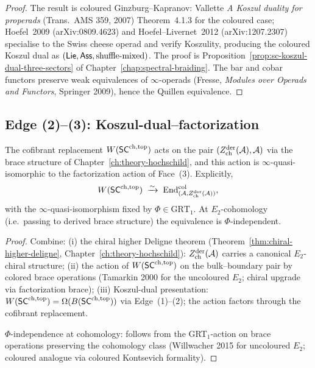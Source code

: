 \begin{proof}
The result is coloured Ginzburg--Kapranov: Vallette
\textit{A Koszul duality for properads} (Trans.\ AMS 359, 2007)
Theorem~4.1.3 for the coloured case; Hoefel~2009 (arXiv:0809.4623)
and Hoefel--Livernet~2012 (arXiv:1207.2307) specialise to the Swiss
cheese operad and verify Koszulity, producing the coloured Koszul
dual as $(\mathsf{Lie},\mathsf{Ass},\text{shuffle-mixed})$. The proof is
Proposition~\ref{prop:sc-koszul-dual-three-sectors} of
Chapter~\ref{chap:spectral-braiding}. The bar and
cobar functors preserve weak equivalences of $\infty$-operads
(Fresse, \textit{Modules over Operads and Functors}, Springer 2009),
hence the Quillen equivalence.
\end{proof}

\subsection{Edge (2)--(3): Koszul-dual--factorization}\label{subsec:edge-23}

\begin{theorem}\label{thm:edge-23}%
The cofibrant replacement $W(\mathsf{SC}^{\mathrm{ch},\mathrm{top}})$ acts on the pair
$(Z^{\mathrm{der}}_{\mathrm{ch}}(\mathcal{A}),\mathcal{A})$ via the brace structure of
Chapter~\ref{ch:theory-hochschild}, and this action is
$\infty$-quasi-isomorphic to the factorization action of
Face~(3). Explicitly,
\begin{equation}
 W(\mathsf{SC}^{\mathrm{ch},\mathrm{top}})
 \;\xrightarrow{\sim}\;
 \mathrm{End}^{\mathrm{col}}_{(\mathcal{A},Z^{\mathrm{der}}_{\mathrm{ch}}(\mathcal{A}))},
\end{equation}
with the $\infty$-quasi-isomorphism fixed by $\Phi\in\mathrm{GRT}_1$.
At $E_2$-cohomology (i.e.\ passing to derived brace structure) the
equivalence is $\Phi$-independent.
\end{theorem}

\begin{proof}
Combine:
(i) the chiral higher Deligne theorem
(Theorem~\ref{thm:chiral-higher-deligne}, Chapter~\ref{ch:theory-hochschild}):
$Z^{\mathrm{der}}_{\mathrm{ch}}(\mathcal{A})$ carries a canonical
$E_2$-chiral structure;
(ii) the action of $W(\mathsf{SC}^{\mathrm{ch},\mathrm{top}})$ on the bulk--boundary pair by
colored brace operations (Tamarkin 2000 for the uncoloured
$E_2$; chiral upgrade via factorization brace);
(iii) Koszul-dual presentation: $W(\mathsf{SC}^{\mathrm{ch},\mathrm{top}})=\Omega(B(\mathsf{SC}^{\mathrm{ch},\mathrm{top}}))$
via Edge~(1)--(2); the action factors through the cofibrant
replacement.

$\Phi$-independence at cohomology: follows from the
GRT$_1$-action on brace operations preserving the cohomology class
(Willwacher 2015 for uncoloured $E_2$; coloured analogue via
coloured Kontsevich formality).
\end{proof}

